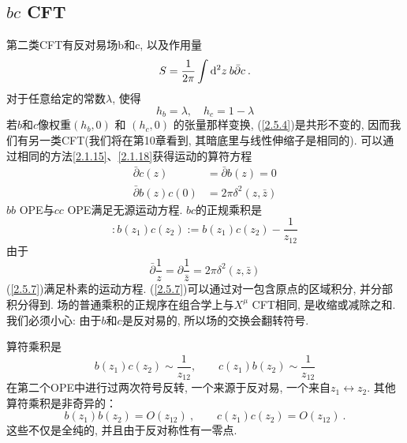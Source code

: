 \subsection*{$bc$ CFT}
第二类CFT有反对易场b和c, 以及作用量
\begin{equation}\label{2.5.4}
S=\frac{1}{2 \pi} \int \mathrm{d}^{2} z\:  b \bar{\partial} c \:. 
\end{equation}
对于任意给定的常数$\lambda$, 使得
\begin{equation}
h_{b}=\lambda, \quad h_{c}=1-\lambda
\end{equation}
若$b$和$c$像权重$\left(h_{b}, 0\right)$ 和 $\left(h_{c}, 0\right)$ 的张量那样变换, (\ref{2.5.4})是共形不变的, 因而我们有另一类CFT(我们将在第10章看到, 其暗底里与线性伸缩子是相同的). 可以通过相同的方法\eqref{2.1.15}、\eqref{2.1.18}获得运动的算符方程
\begin{subequations} \label{2.5.6}
\begin{align}
\bar{\partial} c(z) &=\bar{\partial} b(z)=0  \label{2.5.6a} \\
\bar{\partial} b(z) c(0) &=2 \pi \delta^{2}(z, \bar{z})  \label{2.5.6b} 
\end{align}
\end{subequations}
$bb$ OPE与$cc$ OPE满足无源运动方程. $bc$的正规乘积是
\begin{equation}\label{2.5.7}
: \mathrel{b(z_{1}) c(z_{2})}:=b(z_{1}) c(z_{2})-\frac{1}{z_{12}}
\end{equation}
由于
\begin{equation}
\bar{\partial} \frac{1}{z}=\partial \frac{1}{\bar{z}}=2 \pi \delta^{2}(z, \bar{z})
\end{equation}
(\ref{2.5.7})满足朴素的运动方程. (\ref{2.5.7})可以通过对一包含原点的区域积分, 并分部积分得到. 场的普通乘积的正规序在组合学上与$X^\mu$ CFT相同, 是收缩或减除之和. 
我们必须小心: 由于$b$和$c$是反对易的, 所以场的交换会翻转符号.  

算符乘积是
\begin{equation}
b(z_{1}) c(z_{2}) \sim \frac{1}{z_{12}}, \qquad c(z_{1}) b(z_{2}) \sim \frac{1}{z_{12}}
\end{equation}
在第二个OPE中进行过两次符号反转, 一个来源于反对易, 一个来自$z_{1} \leftrightarrow z_{2}$. 其他算符乘积是非奇异的：
\begin{equation}
b(z_{1}) b(z_{2})=O(z_{12}) \:, \qquad c(z_{1}) c(z_{2})=O(z_{12}) \:.
\end{equation}
这些不仅是全纯的, 并且由于反对称性有一零点.

